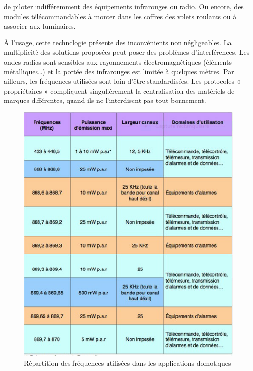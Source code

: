 \documentclass[12pt]{article}
\begin{document}
de piloter indifféremment des équipements infrarouges ou radio. Ou encore, des modules télécommandables à monter dans les coffres des volets roulants ou à associer aux luminaires.

À l’usage, cette technologie présente des inconvénients non négligeables. La multiplicité des solutions proposées peut poser des problèmes d’interférences. Les ondes radios sont sensibles aux rayonnements électromagnétiques (éléments métalliques…) et la portée des infrarouges est limitée à quelques mètres. Par ailleurs, les fréquences utilisées sont loin d’être standardisées. Les protocoles « propriétaires » compliquent singulièrement la centralisation des matériels de marques différentes, quand ils ne l’interdisent pas tout bonnement.

\begin{figure}[h]
\begin{center}
\includegraphics[scale=0.75]{tableau.png}
\caption[le titre]{Répartition des fréquences utilisées dans les 
applications domotiques}
\end{center}
\end{figure}
\end{document}

